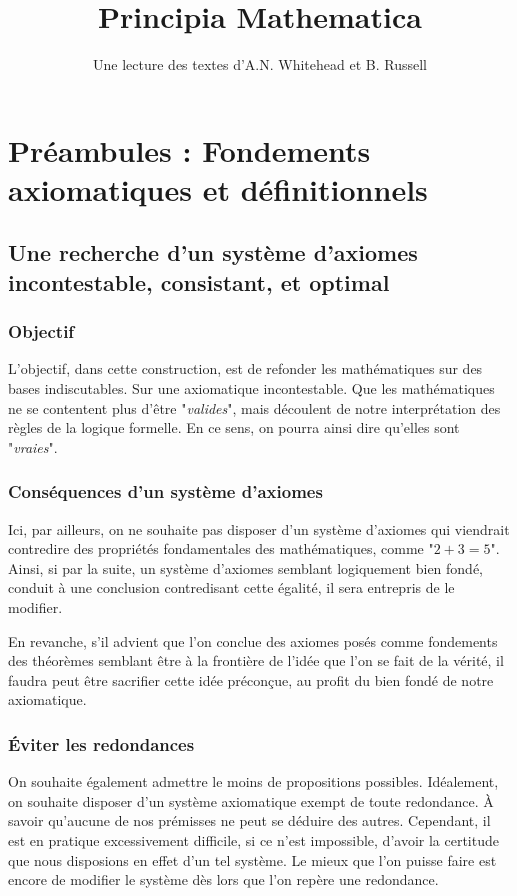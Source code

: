 \documentclass{article}
\title{Principia Mathematica}
\author{Une lecture des textes d'A.N. Whitehead et B. Russell}
\date{}
\begin{document}
\maketitle

\section{Préambules : Fondements axiomatiques et définitionnels}

\subsection{Une recherche d'un système d'axiomes incontestable, consistant, et optimal}

\subsubsection{Objectif}

L'objectif, dans cette construction, est de refonder les mathématiques sur des bases indiscutables. Sur une axiomatique incontestable. Que les mathématiques ne se contentent plus d'être "\textit{valides}", mais découlent de notre interprétation des règles de la logique formelle. En ce sens, on pourra ainsi dire qu'elles sont "\textit{vraies}".

\subsubsection{Conséquences d'un système d'axiomes}

Ici, par ailleurs, on ne souhaite pas disposer d'un système d'axiomes qui viendrait contredire des propriétés fondamentales des mathématiques, comme "$2+3=5$". Ainsi, si par la suite, un système d'axiomes semblant logiquement bien fondé, conduit à une conclusion contredisant cette égalité, il sera entrepris de le modifier.

En revanche, s'il advient que l'on conclue des axiomes posés comme fondements des théorèmes semblant être à la frontière de l'idée que l'on se fait de la vérité, il faudra peut être sacrifier cette idée préconçue, au profit du bien fondé de notre axiomatique.

\subsubsection{Éviter les redondances}

On souhaite également admettre le moins de propositions possibles. Idéalement, on souhaite disposer d'un système axiomatique exempt de toute redondance. À savoir qu'aucune de nos prémisses ne peut se déduire des autres. Cependant, il est en pratique excessivement difficile, si ce n'est impossible, d'avoir la certitude que nous disposions en effet d'un tel système. Le mieux que l'on puisse faire est encore de modifier le système dès lors que l'on repère une redondance.
\end{document}
